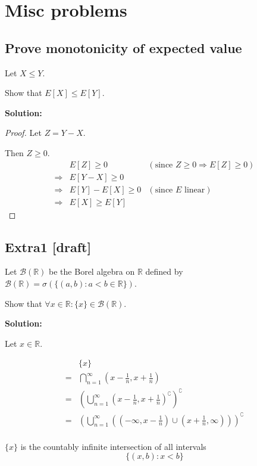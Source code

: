 \documentclass{article}
\begin{document}
\section{Misc problems}
\subsection{Prove monotonicity of expected value}
Let \(X\leq Y\).

Show that \(E[X]\leq E[Y]\).

\textbf{Solution:}

\begin{proof}
Let \(Z=Y-X\).

Then \(Z\geq 0\).
\begin{align*}
     & E[Z]\geq 0 & (\text{since }Z\geq 0 \Rightarrow E[Z]\geq 0) \\
    \Rightarrow& E[Y-X] \geq 0 \\
    \Rightarrow& E[Y]-E[X] \geq 0 & (\text{since }E\text{ linear}) \\
    \Rightarrow& E[X]\geq E[Y]
\end{align*}
\end{proof}

\subsection{Extra1 [draft]}

Let \(\mathcal{B}(\mathbb{R})\) be the Borel algebra on \(\mathbb{R}\)
defined by \(\mathcal{B}(\mathbb{R})=\sigma(\{(a,b): a<b \in \mathbb{R}\})\).

Show that \(\forall x \in \mathbb{R}:\{x\}\in \mathcal{B}(\mathbb{R})\).

\textbf{Solution:}

Let \(x\in \mathbb{R}\).

\begin{align*}
     & \{x\} \\
    =& \bigcap_{n=1}^\infty (x-\frac{1}{n}, x+\frac{1}{n}) \\
    =& \left(\bigcup_{n=1}^\infty (x-\frac{1}{n}, x+\frac{1}{n})^\complement\right)^\complement \\
    =& \left(\bigcup_{n=1}^\infty\left( (-\infty,x-\frac{1}{n})\cup (x+\frac{1}{n}      ,\infty) \right)\right)^\complement \\
\end{align*}

\(\{x\}\) is the countably infinite intersection of all intervals
\[\{(x,b):x<b\}\]
\end{document}
